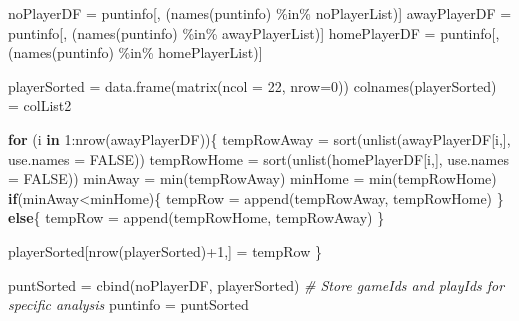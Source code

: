\documentclass[
]{article}
\newenvironment{Shaded}{\begin{snugshade}}{\end{snugshade}}
\newcommand{\AttributeTok}[1]{\textcolor[rgb]{0.77,0.63,0.00}{#1}}
\newcommand{\CommentTok}[1]{\textcolor[rgb]{0.56,0.35,0.01}{\textit{#1}}}
\newcommand{\ConstantTok}[1]{\textcolor[rgb]{0.00,0.00,0.00}{#1}}
\newcommand{\ControlFlowTok}[1]{\textcolor[rgb]{0.13,0.29,0.53}{\textbf{#1}}}
\newcommand{\DecValTok}[1]{\textcolor[rgb]{0.00,0.00,0.81}{#1}}
\newcommand{\FunctionTok}[1]{\textcolor[rgb]{0.00,0.00,0.00}{#1}}
\newcommand{\NormalTok}[1]{#1}
\newcommand{\OtherTok}[1]{\textcolor[rgb]{0.56,0.35,0.01}{#1}}
\newcommand{\SpecialCharTok}[1]{\textcolor[rgb]{0.00,0.00,0.00}{#1}}
\begin{document}
\begin{Shaded}
\begin{Highlighting}[]
\NormalTok{noPlayerDF }\OtherTok{=}\NormalTok{ puntinfo[, (}\FunctionTok{names}\NormalTok{(puntinfo) }\SpecialCharTok{\%in\%}\NormalTok{ noPlayerList)]}
\NormalTok{awayPlayerDF }\OtherTok{=}\NormalTok{ puntinfo[, (}\FunctionTok{names}\NormalTok{(puntinfo) }\SpecialCharTok{\%in\%}\NormalTok{ awayPlayerList)]}
\NormalTok{homePlayerDF }\OtherTok{=}\NormalTok{ puntinfo[, (}\FunctionTok{names}\NormalTok{(puntinfo) }\SpecialCharTok{\%in\%}\NormalTok{ homePlayerList)]}

\NormalTok{playerSorted }\OtherTok{=} \FunctionTok{data.frame}\NormalTok{(}\FunctionTok{matrix}\NormalTok{(}\AttributeTok{ncol =} \DecValTok{22}\NormalTok{, }\AttributeTok{nrow=}\DecValTok{0}\NormalTok{))}
\FunctionTok{colnames}\NormalTok{(playerSorted) }\OtherTok{=}\NormalTok{ colList2}

\ControlFlowTok{for}\NormalTok{ (i }\ControlFlowTok{in} \DecValTok{1}\SpecialCharTok{:}\FunctionTok{nrow}\NormalTok{(awayPlayerDF))\{}
\NormalTok{  tempRowAway }\OtherTok{=} \FunctionTok{sort}\NormalTok{(}\FunctionTok{unlist}\NormalTok{(awayPlayerDF[i,], }\AttributeTok{use.names =} \ConstantTok{FALSE}\NormalTok{))}
\NormalTok{  tempRowHome }\OtherTok{=} \FunctionTok{sort}\NormalTok{(}\FunctionTok{unlist}\NormalTok{(homePlayerDF[i,], }\AttributeTok{use.names =} \ConstantTok{FALSE}\NormalTok{))}
\NormalTok{  minAway }\OtherTok{=} \FunctionTok{min}\NormalTok{(tempRowAway)}
\NormalTok{  minHome }\OtherTok{=} \FunctionTok{min}\NormalTok{(tempRowHome)}
  \ControlFlowTok{if}\NormalTok{(minAway}\SpecialCharTok{\textless{}}\NormalTok{minHome)\{}
\NormalTok{    tempRow }\OtherTok{=} \FunctionTok{append}\NormalTok{(tempRowAway, tempRowHome)}
\NormalTok{  \}}
  \ControlFlowTok{else}\NormalTok{\{}
\NormalTok{    tempRow }\OtherTok{=} \FunctionTok{append}\NormalTok{(tempRowHome, tempRowAway)}
\NormalTok{  \}}
  
\NormalTok{  playerSorted[}\FunctionTok{nrow}\NormalTok{(playerSorted)}\SpecialCharTok{+}\DecValTok{1}\NormalTok{,] }\OtherTok{=}\NormalTok{ tempRow}
\NormalTok{\}}

\NormalTok{puntSorted }\OtherTok{=} \FunctionTok{cbind}\NormalTok{(noPlayerDF, playerSorted)}
\CommentTok{\# Store gameIds and playIds for specific analysis}
\NormalTok{puntinfo }\OtherTok{=}\NormalTok{ puntSorted}
\end{Highlighting}
\end{Shaded}
\end{document}
